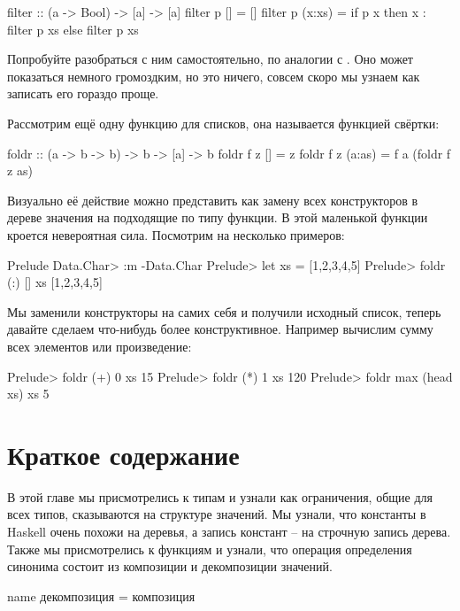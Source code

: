 \begin{code}
filter :: (a -> Bool) -> [a] -> [a]
filter p []     = []
filter p (x:xs) = if p x then x : filter p xs else filter p xs
\end{code}

Попробуйте разобраться с ним самостоятельно, по аналогии с . Оно
может показаться немного громоздким, но это ничего, совсем скоро мы
узнаем как записать его гораздо проще.

Рассмотрим ещё одну функцию для списков, она называется функцией
свёртки:


\begin{code}
foldr :: (a -> b -> b) -> b -> [a] -> b
foldr f z []     = z
foldr f z (a:as) = f a (foldr f z as)
\end{code}

Визуально её действие можно представить как замену всех конструкторов в
дереве значения на подходящие по типу функции. В этой маленькой функции
кроется невероятная сила. Посмотрим на несколько примеров:


\begin{code}
Prelude Data.Char> :m -Data.Char
Prelude> let xs = [1,2,3,4,5]
Prelude> foldr (:) [] xs
[1,2,3,4,5]
\end{code}

Мы заменили конструкторы на самих себя и получили исходный список,
теперь давайте сделаем что-нибудь более конструктивное. Например
вычислим сумму всех элементов или произведение:


\begin{code}
Prelude> foldr (+) 0 xs
15
Prelude> foldr (*) 1 xs
120
Prelude> foldr max (head xs) xs
5
\end{code}

\section{Краткое содержание}

В этой главе мы присмотрелись к типам и узнали как ограничения, общие
для всех типов, сказываются на структуре значений. Мы узнали, что
константы в Haskell очень похожи на деревья, а запись констант -- на
строчную запись дерева. Также мы присмотрелись к функциям и узнали, что
операция определения синонима состоит из композиции и декомпозиции
значений.


\begin{code}
name   декомпозиция   =   композиция
\end{code}

